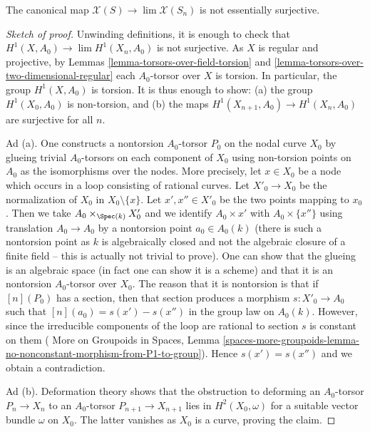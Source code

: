 \begin{lemma}
\label{lemma-not-essentially-surjective}
The canonical map $\mathcal{X}(S) \to \lim \mathcal{X}(S_n)$
is not essentially surjective.
\end{lemma}

\begin{proof}[Sketch of proof]
Unwinding definitions, it is enough to check that
$H^1(X, A_0) \to \lim H^1(X_n, A_0)$ is not surjective.
As $X$ is regular and projective, by
Lemmas \ref{lemma-torsors-over-field-torsion} and
\ref{lemma-torsors-over-two-dimensional-regular}
each $A_0$-torsor over $X$ is torsion.
In particular, the group $H^1(X, A_0)$ is torsion.
It is thus enough to show:
(a) the group $H^1(X_0, A_0)$ is non-torsion, and
(b) the maps $H^1(X_{n + 1}, A_0) \to H^1(X_n, A_0)$ are surjective for all $n$.

\medskip\noindent
Ad (a). One constructs a nontorsion $A_0$-torsor $P_0$ on the nodal
curve $X_0$ by glueing trivial $A_0$-torsors on each component
of $X_0$ using non-torsion points on $A_0$ as the isomorphisms
over the nodes. More precisely, let $x \in X_0$ be a node
which occurs in a loop consisting of rational curves.
Let $X'_0 \to X_0$ be the normalization of $X_0$ in $X_0 \setminus \{x\}$.
Let $x', x'' \in X'_0$ be the two points mapping to $x_0$.
Then we take $A_0 \times_{\Spec(k)} X'_0$ and we identify
$A_0 \times {x'}$ with $A_0 \times \{x''\}$ using translation
$A_0 \to A_0$ by a nontorsion point $a_0 \in A_0(k)$ (there is such
a nontorsion point as $k$ is algebraically closed and not the algebraic
closure of a finite field -- this is actually not trivial to prove).
One can show that the glueing is an algebraic space (in fact one can
show it is a scheme) and that it is an nontorsion $A_0$-torsor over $X_0$.
The reason that it is nontorsion is that if $[n](P_0)$ has a section,
then that section produces a morphism $s : X'_0 \to A_0$ such that
$[n](a_0) = s(x') - s(x'')$ in the group law on $A_0(k)$. However,
since the irreducible components of the loop are rational to
section $s$ is constant on them (
More on Groupoids in Spaces, Lemma
\ref{spaces-more-groupoids-lemma-no-nonconstant-morphism-from-P1-to-group}).
Hence $s(x') = s(x'')$ and we obtain a contradiction.

\medskip\noindent
Ad (b). Deformation theory shows that the obstruction to deforming an
$A_0$-torsor $P_n \to X_n$ to an $A_0$-torsor $P_{n + 1} \to X_{n + 1}$
lies in $H^2(X_0, \omega)$ for a suitable vector bundle $\omega$ on $X_0$.
The latter vanishes as $X_0$ is a curve, proving the claim.
\end{proof}

